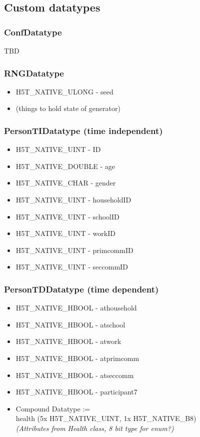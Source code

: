 \documentclass{article}
\begin{document}
		\subsection{Custom datatypes}
			\subsubsection{ConfDatatype}
				TBD
			\subsubsection{RNGDatatype}
				\begin{itemize}
					\item H5T\_NATIVE\_ULONG - seed
					\item (things to hold state of generator)
				\end{itemize}
			\subsubsection{PersonTIDatatype (time independent)}
				\begin{itemize}
					\item H5T\_NATIVE\_UINT - ID
					\item H5T\_NATIVE\_DOUBLE - age
					\item H5T\_NATIVE\_CHAR - gender

					\item H5T\_NATIVE\_UINT - householdID
					\item H5T\_NATIVE\_UINT - schoolID
					\item H5T\_NATIVE\_UINT - workID
					\item H5T\_NATIVE\_UINT - primcommID
					\item H5T\_NATIVE\_UINT - seccommID
				\end{itemize}
			\subsubsection{PersonTDDatatype (time dependent)}
				\begin{itemize}
					\item H5T\_NATIVE\_HBOOL - athousehold
					\item H5T\_NATIVE\_HBOOL - atschool
					\item H5T\_NATIVE\_HBOOL - atwork
					\item H5T\_NATIVE\_HBOOL - atprimcomm
					\item H5T\_NATIVE\_HBOOL - atseccomm
					\item H5T\_NATIVE\_HBOOL - participant7

					\item Compound Datatype := \\
						\hspace*{1cm} health (5x H5T\_NATIVE\_UINT, 1x H5T\_NATIVE\_B8) \\
						\textit{(Attributes from Health class, 8 bit type for enum?)}

				\end{itemize}
\end{document}
